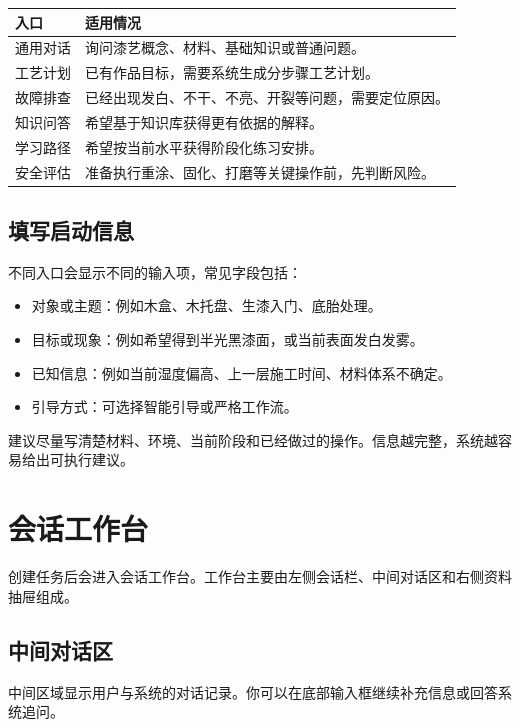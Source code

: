 \documentclass[UTF8,a4paper,12pt]{ctexart}
\begin{document}
\begin{longtable}{>{\raggedright\arraybackslash}p{3cm}>{\raggedright\arraybackslash}p{10cm}}
\hline
\textbf{入口} & \textbf{适用情况} \\
\hline
通用对话 & 询问漆艺概念、材料、基础知识或普通问题。 \\
工艺计划 & 已有作品目标，需要系统生成分步骤工艺计划。 \\
故障排查 & 已经出现发白、不干、不亮、开裂等问题，需要定位原因。 \\
知识问答 & 希望基于知识库获得更有依据的解释。 \\
学习路径 & 希望按当前水平获得阶段化练习安排。 \\
安全评估 & 准备执行重涂、固化、打磨等关键操作前，先判断风险。 \\
\hline
\end{longtable}

\subsection{填写启动信息}

不同入口会显示不同的输入项，常见字段包括：

\begin{itemize}[leftmargin=2em]
  \item 对象或主题：例如木盒、木托盘、生漆入门、底胎处理。
  \item 目标或现象：例如希望得到半光黑漆面，或当前表面发白发雾。
  \item 已知信息：例如当前湿度偏高、上一层施工时间、材料体系不确定。
  \item 引导方式：可选择智能引导或严格工作流。
\end{itemize}

建议尽量写清楚材料、环境、当前阶段和已经做过的操作。信息越完整，系统越容易给出可执行建议。

\section{会话工作台}

创建任务后会进入会话工作台。工作台主要由左侧会话栏、中间对话区和右侧资料抽屉组成。

\subsection{中间对话区}

中间区域显示用户与系统的对话记录。你可以在底部输入框继续补充信息或回答系统追问。
\end{document}
